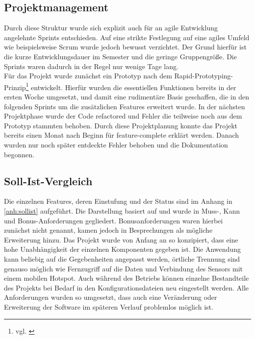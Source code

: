 \subsection*{Projektmanagement}
Durch diese Struktur wurde sich explizit auch für an agile Entwicklung angelehnte Sprints entschieden.
Auf eine strikte Festlegung auf eine agiles Umfeld wie beispielsweise Scrum wurde jedoch bewusst verzichtet.
Der Grund hierfür ist die kurze Entwicklungsdauer im Semester und die geringe Gruppengröße.
Die Sprints waren dadurch in der Regel nur wenige Tage lang. \\
Für das Projekt wurde zunächst ein Prototyp nach dem Rapid-Prototyping-Prinzip\footnote{vgl. \cite{krypczyk.2019}} entwickelt.
Hierfür wurden die essentiellen Funktionen bereits in der ersten Woche umgesetzt, und damit eine rudimentäre Basis geschaffen, die in den folgenden Sprints um die zusätzlichen Features erweitert wurde.
In der nächsten Projektphase wurde der Code refactored und Fehler die teilweise noch aus dem Prototyp stammten behoben.
Durch diese Projektplanung konnte das Projekt bereits einen Monat nach Beginn für feature-complete erklärt werden.
Danach wurden nur noch später entdeckte Fehler behoben und die Dokumentation begonnen.
\subsection*{Soll-Ist-Vergleich}
Die einzelnen Features, deren Einstufung und der Status sind im Anhang in \autoref{anh:sollist} aufgeführt.
Die Darstellung basiert auf \cite{Wortmann.2020} und wurde in Muss-, Kann und Bonus-Anforderungen gegliedert. Bonusanforderungen waren hierbei zunächst nicht genannt, kamen jedoch in Besprechungen als mögliche Erweiterung hinzu.
Das Projekt wurde von Anfang an so konzipiert, dass eine hohe Unabhängigkeit der einzelnen Komponenten gegeben ist.
Die Anwendung kann beliebig auf die Gegebenheiten angepasst werden, örtliche Trennung sind genauso möglich wie Fernzugriff auf die Daten und Verbindung des Sensors mit einem mobilen Hotspot.
Auch während des Betriebs können einzelne Bestandteile des Projekts bei Bedarf in den Konfigurationsdateien neu eingestellt werden.
Alle Anforderungen wurden so umgesetzt, dass auch eine Veränderung oder Erweiterung der Software im späteren Verlauf problemlos möglich ist. 